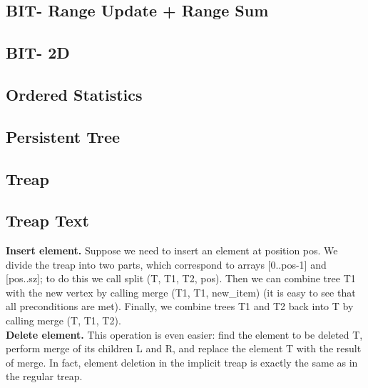 \documentclass[9pt]{extarticle}
\begin{document}
\begin{multicols*}{3}
% 

\subsection{BIT- Range Update + Range Sum} %


\subsection{BIT- 2D} %


\subsection{Ordered Statistics} %


\subsection{Persistent Tree} %


\subsection{Treap} %


\subsection{Treap Text} 
\textbf{Insert element.}
Suppose we need to insert an element at position pos. We divide the treap into two parts, which correspond to arrays [0..pos-1] and [pos..sz]; to do this we call split (T, T1, T2, pos). Then we can combine tree T1 with the new vertex by calling merge (T1, T1, new\_item) (it is easy to see that all preconditions are met). Finally, we combine trees T1 and T2 back into T by calling merge (T, T1, T2).\\
\textbf{Delete element.}
This operation is even easier: find the element to be deleted T, perform merge of its children L and R, and replace the element T with the result of merge. In fact, element deletion in the implicit treap is exactly the same as in the regular treap.



\end{multicols*}
\end{document}
